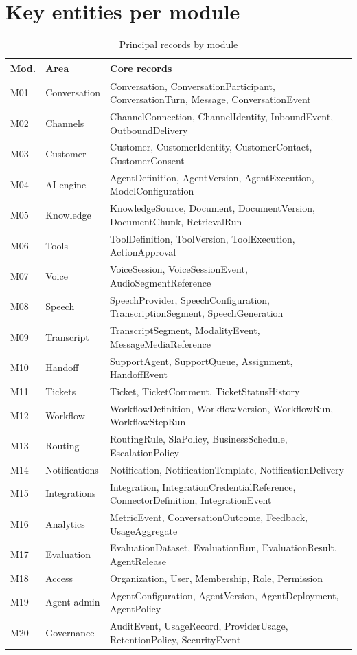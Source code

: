 \section{Key entities per module}
\begin{table}[htbp]
\centering\caption{Principal records by module}\label{tab:records}
\begin{tabular}{@{}p{1.2cm}p{3.6cm}p{11.2cm}@{}}
\toprule \textbf{Mod.} & \textbf{Area} & \textbf{Core records} \\ \midrule
M01 & Conversation & Conversation, ConversationParticipant, ConversationTurn, Message, ConversationEvent \\
M02 & Channels & ChannelConnection, ChannelIdentity, InboundEvent, OutboundDelivery \\
M03 & Customer & Customer, CustomerIdentity, CustomerContact, CustomerConsent \\
M04 & AI engine & AgentDefinition, AgentVersion, AgentExecution, ModelConfiguration \\
M05 & Knowledge & KnowledgeSource, Document, DocumentVersion, DocumentChunk, RetrievalRun \\
M06 & Tools & ToolDefinition, ToolVersion, ToolExecution, ActionApproval \\
M07 & Voice & VoiceSession, VoiceSessionEvent, AudioSegmentReference \\
M08 & Speech & SpeechProvider, SpeechConfiguration, TranscriptionSegment, SpeechGeneration \\
M09 & Transcript & TranscriptSegment, ModalityEvent, MessageMediaReference \\
M10 & Handoff & SupportAgent, SupportQueue, Assignment, HandoffEvent \\
M11 & Tickets & Ticket, TicketComment, TicketStatusHistory \\
M12 & Workflow & WorkflowDefinition, WorkflowVersion, WorkflowRun, WorkflowStepRun \\
M13 & Routing & RoutingRule, SlaPolicy, BusinessSchedule, EscalationPolicy \\
M14 & Notifications & Notification, NotificationTemplate, NotificationDelivery \\
M15 & Integrations & Integration, IntegrationCredentialReference, ConnectorDefinition, IntegrationEvent \\
M16 & Analytics & MetricEvent, ConversationOutcome, Feedback, UsageAggregate \\
M17 & Evaluation & EvaluationDataset, EvaluationRun, EvaluationResult, AgentRelease \\
M18 & Access & Organization, User, Membership, Role, Permission \\
M19 & Agent admin & AgentConfiguration, AgentVersion, AgentDeployment, AgentPolicy \\
M20 & Governance & AuditEvent, UsageRecord, ProviderUsage, RetentionPolicy, SecurityEvent \\
\bottomrule
\end{tabular}
\end{table}

